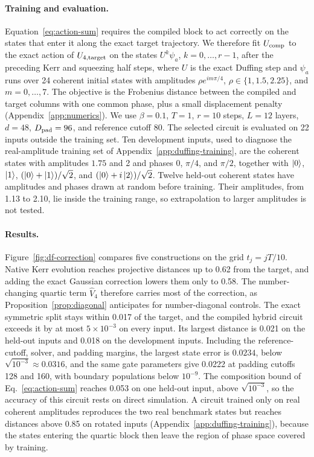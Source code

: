 \documentclass[pra,twocolumn,superscriptaddress,nofootinbib,floatfix]{revtex4-2}
\theoremstyle{remark}
\begin{document}
\paragraph{Training and evaluation.}
Equation~\eqref{eq:action-sum} requires the compiled block to act correctly on the states that enter it along the exact target trajectory. We therefore fit \(U_{\rm comp}\) to the exact action of \(U_{4,\rm target}\) on the states \(U^k\psi_a\), \(k=0,\ldots,r-1\), after the preceding Kerr and squeezing half steps, where \(U\) is the exact Duffing step and \(\psi_a\) runs over 24 coherent initial states with amplitudes \(\rho e^{im\pi/4}\), \(\rho\in\{1,1.5,2.25\}\), and \(m=0,\ldots,7\). The objective is the Frobenius distance between the compiled and target columns with one common phase, plus a small displacement penalty (Appendix~\ref{app:numerics}). We use \(\beta=0.1\), \(T=1\), \(r=10\) steps, \(L=12\) layers, \(d=48\), \(D_{\rm pad}=96\), and reference cutoff 80. The selected circuit is evaluated on 22 inputs outside the training set. Ten development inputs, used to diagnose the real-amplitude training set of Appendix~\ref{app:duffing-training}, are the coherent states with amplitudes \(1.75\) and 2 and phases 0, \(\pi/4\), and \(\pi/2\), together with \(\ket0\), \(\ket1\), \((\ket0+\ket1)/\sqrt2\), and \((\ket0+i\ket2)/\sqrt2\). Twelve held-out coherent states have amplitudes and phases drawn at random before training. Their amplitudes, from 1.13 to 2.10, lie inside the training range, so extrapolation to larger amplitudes is not tested.

\paragraph{Results.}
Figure~\ref{fig:df-correction} compares five constructions on the grid \(t_j=jT/10\). Native Kerr evolution reaches projective distances up to 0.62 from the target, and adding the exact Gaussian correction lowers them only to 0.58. The number-changing quartic term \(\hat V_4\) therefore carries most of the correction, as Proposition~\ref{prop:diagonal} anticipates for number-diagonal controls. The exact symmetric split stays within 0.017 of the target, and the compiled hybrid circuit exceeds it by at most \(5\times10^{-3}\) on every input. Its largest distance is 0.021 on the held-out inputs and 0.018 on the development inputs. Including the reference-cutoff, solver, and padding margins, the largest state error is \(0.0234\), below \(\sqrt{10^{-3}}\approx0.0316\), and the same gate parameters give 0.0222 at padding cutoffs 128 and 160, with boundary populations below \(10^{-9}\). The composition bound of Eq.~\eqref{eq:action-sum} reaches 0.053 on one held-out input, above \(\sqrt{10^{-3}}\), so the accuracy of this circuit rests on direct simulation. A circuit trained only on real coherent amplitudes reproduces the two real benchmark states but reaches distances above 0.85 on rotated inputs (Appendix~\ref{app:duffing-training}), because the states entering the quartic block then leave the region of phase space covered by training.
\end{document}
